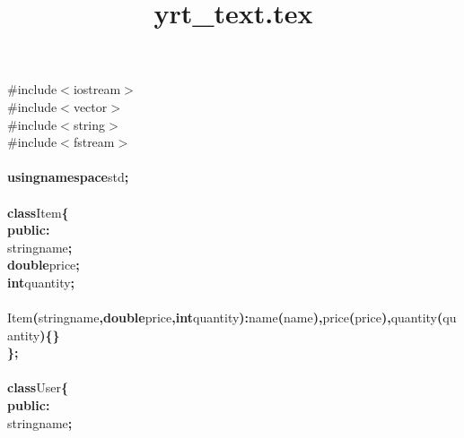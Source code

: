 \documentclass[a4paper, 17pt]{article}
\title{yrt_text.tex}
\newcommand\SPC{\hspace*{0.6em}}
\newcommand{\CppAIdentifier}[1]{#1}
\newcommand{\CppAPreprocessor}[1]{\textcolor[rgb]{0,0.5,0}{#1}}
\newcommand{\CppAReservedWord}[1]{\textbf{#1}}
\newcommand{\CppASpace}[1]{\colorbox[rgb]{1,1,1}{#1}}
\newcommand{\CppASymbol}[1]{\textbf{\textcolor[rgb]{1,0,0}{#1}}}
\begin{document}
\begin{ttfamily}
\noindent
\CppAPreprocessor{\#include\SPC $<$iostream$>$}\\
\CppAPreprocessor{\#include\SPC $<$vector$>$}\\
\CppAPreprocessor{\#include\SPC $<$string$>$}\\
\CppAPreprocessor{\#include\SPC $<$fstream$>$}\\
\\
\CppAReservedWord{using}\CppASpace{\SPC }\CppAReservedWord{namespace}\CppASpace{\SPC }\CppAIdentifier{std}\CppASymbol{;}\\
\\
\CppAReservedWord{class}\CppASpace{\SPC }\CppAIdentifier{Item}\CppASpace{\SPC }\CppASymbol{\{}\\
\CppAReservedWord{public}\CppASymbol{:}\\
\CppASpace{\SPC \SPC \SPC \SPC }\CppAIdentifier{string}\CppASpace{\SPC }\CppAIdentifier{name}\CppASymbol{;}\\
\CppASpace{\SPC \SPC \SPC \SPC }\CppAReservedWord{double}\CppASpace{\SPC }\CppAIdentifier{price}\CppASymbol{;}\\
\CppASpace{\SPC \SPC \SPC \SPC }\CppAReservedWord{int}\CppASpace{\SPC }\CppAIdentifier{quantity}\CppASymbol{;}\\
\\
\CppASpace{\SPC \SPC \SPC \SPC }\CppAIdentifier{Item}\CppASymbol{(}\CppAIdentifier{string}\CppASpace{\SPC }\CppAIdentifier{name}\CppASymbol{,}\CppASpace{\SPC }\CppAReservedWord{double}\CppASpace{\SPC }\CppAIdentifier{price}\CppASymbol{,}\CppASpace{\SPC }\CppAReservedWord{int}\CppASpace{\SPC }\CppAIdentifier{quantity}\CppASymbol{)}\CppASpace{\SPC }\CppASymbol{:}\CppASpace{\SPC }\CppAIdentifier{name}\CppASymbol{(}\CppAIdentifier{name}\CppASymbol{)}\CppASymbol{,}\CppASpace{\SPC }\CppAIdentifier{price}\CppASymbol{(}\CppAIdentifier{price}\CppASymbol{)}\CppASymbol{,}\CppASpace{\SPC }\CppAIdentifier{quantity}\CppASymbol{(}\CppAIdentifier{quantity}\CppASymbol{)}\CppASpace{\SPC }\CppASymbol{\{}\CppASymbol{\}}\\
\CppASymbol{\}}\CppASymbol{;}\\
\\
\CppAReservedWord{class}\CppASpace{\SPC }\CppAIdentifier{User}\CppASpace{\SPC }\CppASymbol{\{}\\
\CppAReservedWord{public}\CppASymbol{:}\\
\CppASpace{\SPC \SPC \SPC \SPC }\CppAIdentifier{string}\CppASpace{\SPC }\CppAIdentifier{name}\CppASymbol{;}\\

\end{ttfamily}
\end{document}
